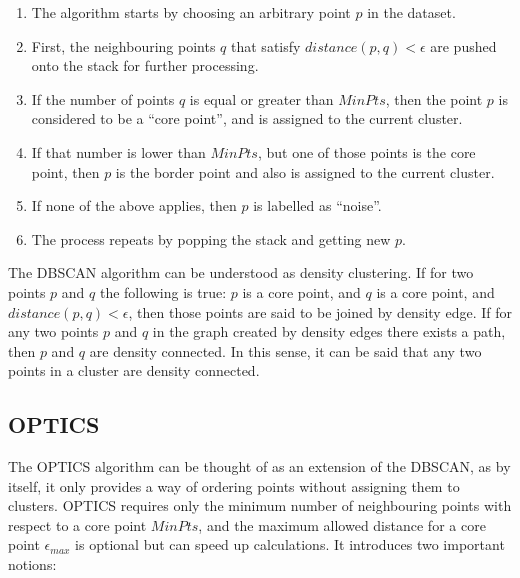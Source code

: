 \begin{center}
\begin{enumerate}
\item The algorithm starts by choosing an arbitrary point $p$ in the dataset.
\item First, the neighbouring points $q$ that satisfy $ distance(p,q) < \epsilon$ are pushed onto the stack for further processing.
\item If the number of points $q$ is equal or greater than $MinPts$, then the point $p$ is considered to be a ``core point'', and is assigned to the current cluster.
\item If that number is lower than $MinPts$, but one of those points is the core point, then $p$ is the border point and also is assigned to the current cluster.
\item If none of the above applies, then $p$ is labelled as ``noise''.
\item The process repeats by popping the stack and getting new $p$.
\end{enumerate}
\end{center}

The DBSCAN algorithm can be understood as density clustering.
If for two points $p$ and $q$ the following is true: $p$ is a core point, and $q$ is a core point, and  $distance(p,q) < \epsilon$, then those points are said to be joined by density edge.
If for any two points $p$ and $q$ in the graph created by density edges there exists a path, then $p$ and $q$ are density connected.
In this sense, it can be said that any two points in a cluster are density connected.

\subsection{OPTICS}

The OPTICS \cite{10.1145/304182.304187, rhys2020machine} algorithm can be thought of as an extension of the DBSCAN, as by itself, it only provides a way of ordering points without assigning them to clusters.
OPTICS requires only the minimum number of neighbouring points with respect to a core point $MinPts$, and the maximum allowed distance for a core point $\epsilon_{max}$ is optional but can speed up calculations.
It introduces two important notions:

